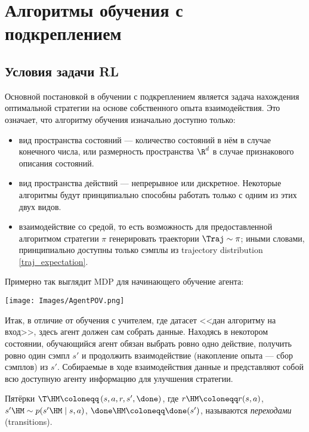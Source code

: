 \section{Алгоритмы обучения с подкреплением}

\subsection{Условия задачи RL}

Основной постановкой в обучении с подкреплением является задача нахождения оптимальной стратегии на основе собственного опыта взаимодействия. Это означает, что алгоритму обучения изначально доступно только:

\begin{itemize}
    \item вид пространства состояний --- количество состояний в нём в случае конечного числа, или размерность пространства $\R^d$ в случае признакового описания состояний.
    \item вид пространства действий --- непрерывное или дискретное. Некоторые алгоритмы будут принципиально способны работать только с одним из этих двух видов.
    \item взаимодействие со средой, то есть возможность для предоставленной алгоритмом стратегии $\pi$ генерировать траектории $\Traj \sim \pi$; иными словами, принципиально доступны только сэмплы из trajectory distribution \eqref{traj_expectation}.
\end{itemize}

Примерно так выглядит MDP для начинающего обучение агента:

\begin{center}
    \texttt{[image: Images/AgentPOV.png]}
\end{center}

Итак, в отличие от обучения с учителем, где датасет <<дан алгоритму на вход>>, здесь агент должен сам собрать данные. Находясь в некотором состоянии, обучающийся агент обязан выбрать ровно одно действие, получить ровно один сэмпл $s'$ и продолжить взаимодействие (накопление опыта --- сбор сэмплов) из $s'$. Собираемые в ходе взаимодействия данные и представляют собой всю доступную агенту информацию для улучшения стратегии.

\begin{definition}
Пятёрки $\T \HM\coloneqq \left( s, a, r, s', \done \right)$, где $r \HM\coloneqq r(s, a)$, $s' \HM\sim p(s' \HM\mid s, a)$, $\done \HM\coloneqq \done(s')$, называются \emph{переходами} (transitions). 
\end{definition}

